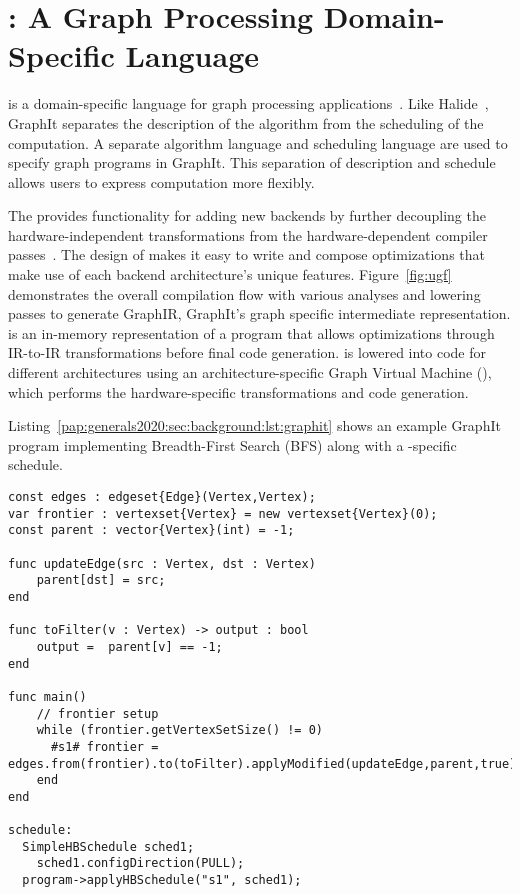 
\section{\graphit: A Graph Processing Domain-Specific Language}\label{pap:generals2020:sec:graphit}
\ugfoverview
\graphit is a domain-specific language for graph processing applications~\citep{zhang2018graphit,brahmakshatriya2021compiling,zhang2019optimizing}.
Like Halide~\citep{ragan2013halide}, GraphIt separates the description of the algorithm from the scheduling of the computation. 
A separate algorithm language and scheduling language are used to specify graph programs in GraphIt. 
This separation of description and schedule allows users to express computation more flexibly.

The \ugc provides functionality for adding new backends by further decoupling the hardware-independent transformations from the hardware-dependent compiler passes~\cite{brahmakshatriya2021taming}.
The design of \ugc makes it easy to write and compose optimizations that make use of each backend architecture's unique features.
Figure~\ref{fig:ugf} demonstrates the overall compilation flow with various analyses and lowering passes to generate GraphIR, GraphIt's graph specific intermediate representation.
\graphisa is an in\hyp{}memory representation of a program that allows optimizations through IR-to-IR transformations before final code generation.
\graphisa is lowered into code for different architectures using an architecture-specific Graph Virtual Machine (\graphvm), which performs the hardware-specific transformations and code generation.

Listing~\ref{pap:generals2020:sec:background:lst:graphit} shows an example GraphIt program implementing Breadth-First Search (BFS) along with a \hb-specific schedule.
\hfill
\break 
\begin{lstlisting}[language=graphit, 
                   caption=GraphIt code for Breadth-First Search (BFS) with a HammerBlade manycore schedule.,
                   label=pap:generals2020:sec:background:lst:graphit]
const edges : edgeset{Edge}(Vertex,Vertex);
var frontier : vertexset{Vertex} = new vertexset{Vertex}(0);
const parent : vector{Vertex}(int) = -1;

func updateEdge(src : Vertex, dst : Vertex)
    parent[dst] = src;
end

func toFilter(v : Vertex) -> output : bool
    output =  parent[v] == -1;
end

func main()
    // frontier setup
    while (frontier.getVertexSetSize() != 0)
      #s1# frontier = edges.from(frontier).to(toFilter).applyModified(updateEdge,parent,true);
    end
end

schedule:
  SimpleHBSchedule sched1;
    sched1.configDirection(PULL);
  program->applyHBSchedule("s1", sched1);
\end{lstlisting}

